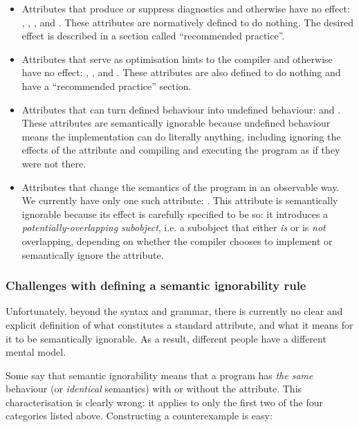 \begin{itemize}
\item Attributes that produce or suppress diagnostics and otherwise have no effect: , , , and . These attributes are normatively defined to do nothing. The desired effect is described in a section called ``recommended practice''.
\item Attributes that serve as optimisation hints to the compiler and otherwise have no effect: , , and . These attributes are also defined to do nothing and have a ``recommended practice'' section.
\item Attributes that can turn defined behaviour into undefined behaviour:  and . These attributes are semantically ignorable because undefined behaviour means the implementation can do literally anything, including ignoring the effects of the attribute and compiling and executing the program as if they were not there.
\item Attributes that change the semantics of the program in an observable way. We currently have only one such attribute: . This attribute is semantically ignorable because its effect is carefully specified to be so: it introduces a \emph{potentially-overlapping subobject}, i.e. a subobject that either \emph{is} or is \emph{not} overlapping, depending on whether the compiler chooses to implement or semantically ignore the attribute.
\end{itemize}

\subsubsection{Challenges with defining a semantic ignorability rule}
\label{subsubsec:challenges}

Unfortunately, beyond the syntax and grammar, there is currently no clear and explicit definition of what constitutes a standard attribute, and what it means for it to be semantically ignorable. As a result, different people have a different mental model.

Some say that semantic ignorability means that a program has \emph{the same} behaviour (or \emph{identical} semantics) with or without the attribute. This characterisation is clearly wrong: it applies to only the first two of the four categories listed above. Constructing a counterexample is easy:


